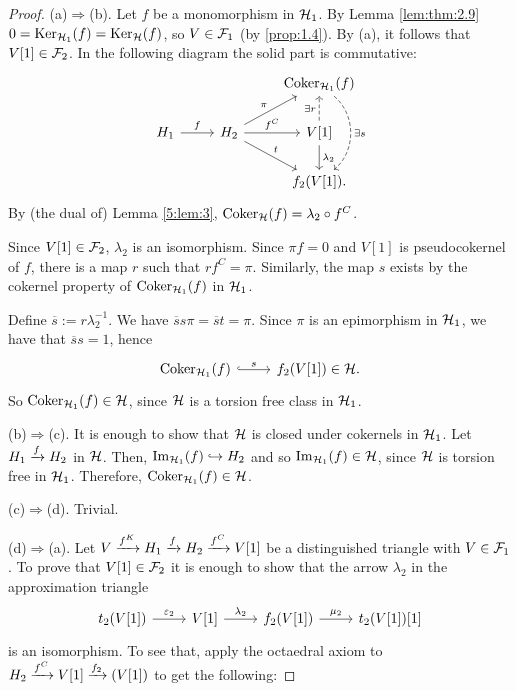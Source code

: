 \begin{proof}
  (a)$\Rightarrow$(b). Let $f$ be a monomorphism in $\mathcal{H}_1$. By Lemma \ref{lem:thm:2.9} $0=\operatorname{Ker}_{\mathcal{H}_1}(f)=\operatorname{Ker}_{\mathcal{H}}(f)$, so $V\in\mathcal{F}_1$ (by \ref{prop:1.4}). By (a), it follows that $V[1]\in\mathcal{F}_2$. In the following diagram the solid part is commutative:
  \begin{equation*}
    \begin{tikzcd}
      & & \Coker_{\clH_1}(f)\arrow[bend left=50,dashed]{dd}{\exists s}\\
      H_1\arrow{r}{f}
      & H_2\arrow{ur}{\pi}\arrow{r}{f^C}\arrow{dr}{t}
        & V[1]\arrow[dashed]{u}{\exists r}\arrow{d}{\lambda_2}\\
      & & f_2(V[1]).
    \end{tikzcd}
  \end{equation*}
  By (the dual of) Lemma \ref{5:lem:3}, $\operatorname{Coker}_{\mathcal{H}}(f)=\lambda_2\circ f^C$.

  Since $V[1]\in\mathcal{F}_2$, $\lambda_2$ is an isomorphism. Since $\pi f =0$ and $V[1]$ is pseudocokernel of $f$, there is a map $r$ such that $rf^C=\pi$. Similarly, the map $s$ exists by the cokernel property of $\operatorname{Coker}_{\mathcal{H}_1}(f)$ in $\mathcal{H}_1$.

  Define $\overline{s}:=r\lambda_2^{-1}$. We have $\overline{s}s\pi=\overline{s}t=\pi$. Since $\pi$ is an epimorphism in $\mathcal{H}_1$, we have that $\overline{s}s=1$, hence
  \begin{equation*}
    \begin{tikzcd}
      \Coker_{\clH_1}(f)\arrow[hook]{r}{s}
      & f_2(V[1])\in\clH.
    \end{tikzcd}
  \end{equation*}
  So $\operatorname{Coker}_{\mathcal{H}_1}(f)\in\mathcal{H}$, since $\mathcal{H}$ is a torsion free class in $\mathcal{H}_1$.

  \smallskip\noindent
  \begin{sloppypar}
  (b)$\Rightarrow$(c). It is enough to show that $\mathcal{H}$ is closed under cokernels in $\mathcal{H}_1$. Let $H_1\xrightarrow{f}H_2$ in $\mathcal{H}$. Then, $\operatorname{Im}_{\mathcal{H}_1}(f)\hookrightarrow H_2$ and so $\operatorname{Im}_{\mathcal{H}_1}(f)\in\mathcal{H}$, since $\mathcal{H}$ is torsion free in $\mathcal{H}_1$. Therefore, ${\operatorname{Coker}_{\mathcal{H}_1}(f)\in\mathcal{H}}$.
\end{sloppypar}

  \smallskip\noindent
  (c)$\Rightarrow$(d). Trivial.

  \smallskip\noindent
  (d)$\Rightarrow$(a). Let $V\xrightarrow{f^K}H_1\xrightarrow{f}H_2\xrightarrow{f^C}V[1]$ be a distinguished triangle with $V\in\mathcal{F}_1$. To prove that $V[1]\in\mathcal{F}_2$ it is enough to show that the arrow $\lambda_2$ in the approximation triangle
  \begin{equation*}
    \begin{tikzcd}
      t_2(V[1])\arrow{r}{\varepsilon_2}
      & V[1]\arrow{r}{\lambda_2}
        & f_2(V[1])\arrow{r}{\mu_2}
          & t_2(V[1])[1]
    \end{tikzcd}
  \end{equation*}
  is an isomorphism. To see that, apply the octaedral axiom to $H_2\xrightarrow{f^C}V[1]\xrightarrow{f_2}(V[1])$ to get the following:


\end{proof}
